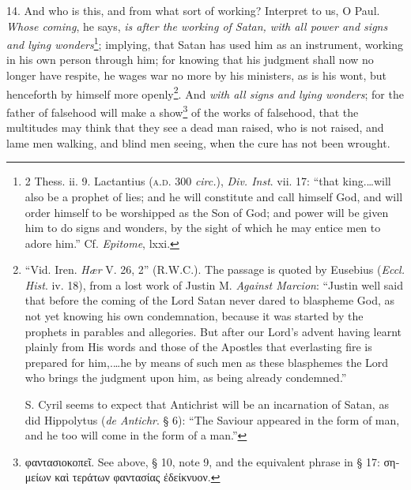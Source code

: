 14. And who is this, and from what sort of working? Interpret to us, O Paul. \emph{Whose coming}, he says, \emph{is after the working of Satan, with all power and signs and lying wonders}\footnote{2 Thess. ii. 9. Lactantius (\textsc{a.d.} 300 \emph{circ.}), \emph{Div. Inst}. vii. 17: “that king.…will also be a prophet of lies; and he will constitute and call himself God, and will order himself to be worshipped as the Son of God; and power will be given him to do signs and wonders, by the sight of which he may entice men to adore him.” Cf. \emph{Epitome}, lxxi.}; implying, that Satan has used him as an instrument, working in his own person through him; for knowing that his judgment shall now no longer have respite, he wages war no more by his ministers, as is his wont, but henceforth by himself more openly\footnote{“Vid. Iren. \emph{Hær} V. 26, 2” (R.W.C.). The passage is quoted by Eusebius (\emph{Eccl. Hist}. iv. 18), from a lost work of Justin M. \emph{Against Marcion}: “Justin well said that before the coming of the Lord Satan never dared to blaspheme God, as not yet knowing his own condemnation, because it was started by the prophets in parables and allegories. But after our Lord’s advent having learnt plainly from His words and those of the Apostles that everlasting fire is prepared for him,.…he by means of such men as these blasphemes the Lord who brings the judgment upon him, as being already condemned.” \par S. Cyril seems to expect that Antichrist will be an incarnation of Satan, as did Hippolytus (\emph{de Antichr}. § 6): “The Saviour appeared in the form of man, and he too will come in the form of a man.”}. And \emph{with all signs and lying wonders}; for the father of falsehood will make a show\footnote{\textgreek{φαντασιοκοπεῖ}. See above, § 10, note 9, and the equivalent phrase in § 17: \textgreek{σημείων καὶ τεράτων φαντασίας ἐδείκνυον}.} of the works of falsehood, that the multitudes may think that they see a dead man raised, who is not raised, and lame men walking, and blind men seeing, when the cure has not been wrought.

